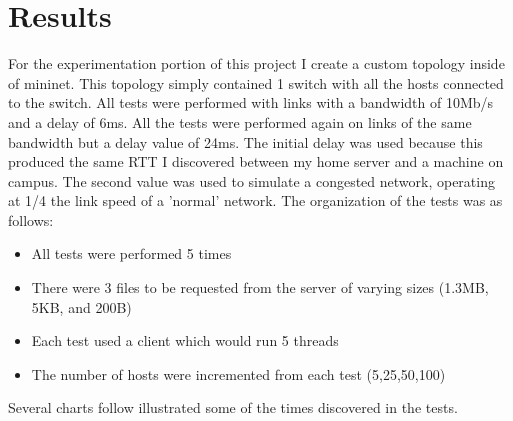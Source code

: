 \documentclass[10pt]{report}
\begin{document}
\section{Results}
For the experimentation portion of this project I create a custom
topology inside of mininet. This topology simply contained 1 switch
with all the hosts connected to the switch. All tests were performed
with links with a bandwidth of 10Mb/s and a delay of 6ms. All the
tests were performed again on links of the same bandwidth but a delay
value of 24ms. The initial delay was used because this produced the
same RTT I discovered between my home server and a machine on
campus. The second value was used to simulate a congested network,
operating at 1/4 the link speed of a 'normal' network. The
organization of the tests was as follows:
\begin{itemize}
\item All tests were performed 5 times
\item There were 3 files to be requested from the server of varying
  sizes (1.3MB, 5KB, and 200B)
\item Each test used a client which would run 5 threads
\item The number of hosts were incremented from each test
  (5,25,50,100)
\end{itemize}
Several charts follow illustrated some of the times discovered in the
tests.
\end{document}
